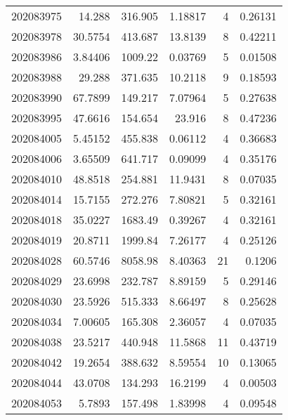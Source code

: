 \begin{tabular}{rrrrrr}
 202083975 &         14.288   &      316.905  &            1.18817 &           4 & 0.26131 \\
 202083978 &         30.5754  &      413.687  &           13.8139  &           8 & 0.42211 \\
 202083986 &          3.84406 &     1009.22   &            0.03769 &           5 & 0.01508 \\
 202083988 &         29.288   &      371.635  &           10.2118  &           9 & 0.18593 \\
 202083990 &         67.7899  &      149.217  &            7.07964 &           5 & 0.27638 \\
 202083995 &         47.6616  &      154.654  &           23.916   &           8 & 0.47236 \\
 202084005 &          5.45152 &      455.838  &            0.06112 &           4 & 0.36683 \\
 202084006 &          3.65509 &      641.717  &            0.09099 &           4 & 0.35176 \\
 202084010 &         48.8518  &      254.881  &           11.9431  &           8 & 0.07035 \\
 202084014 &         15.7155  &      272.276  &            7.80821 &           5 & 0.32161 \\
 202084018 &         35.0227  &     1683.49   &            0.39267 &           4 & 0.32161 \\
 202084019 &         20.8711  &     1999.84   &            7.26177 &           4 & 0.25126 \\
 202084028 &         60.5746  &     8058.98   &            8.40363 &          21 & 0.1206  \\
 202084029 &         23.6998  &      232.787  &            8.89159 &           5 & 0.29146 \\
 202084030 &         23.5926  &      515.333  &            8.66497 &           8 & 0.25628 \\
 202084034 &          7.00605 &      165.308  &            2.36057 &           4 & 0.07035 \\
 202084038 &         23.5217  &      440.948  &           11.5868  &          11 & 0.43719 \\
 202084042 &         19.2654  &      388.632  &            8.59554 &          10 & 0.13065 \\
 202084044 &         43.0708  &      134.293  &           16.2199  &           4 & 0.00503 \\
 202084053 &          5.7893  &      157.498  &            1.83998 &           4 & 0.09548 \\

\end{tabular}
